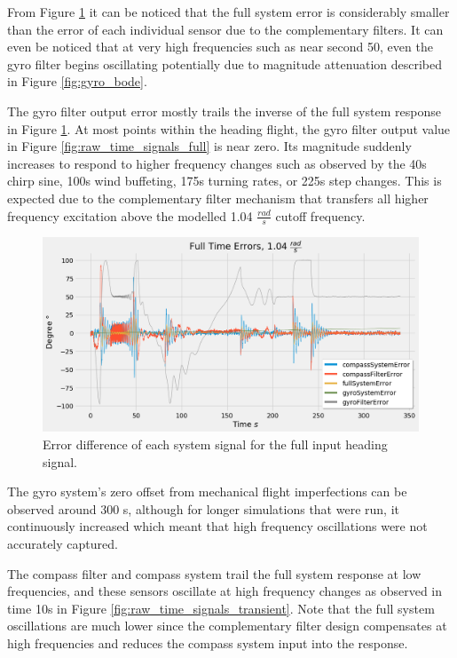From Figure \ref{fig:raw_time_errors_full} it can be noticed that the full system error is considerably smaller than the error of each individual sensor due to the complementary filters. It can even be noticed that at very high frequencies such as near second 50, even the gyro filter begins oscillating potentially due to magnitude attenuation described in Figure \ref{fig:gyro_bode}.

The gyro filter output error mostly trails the inverse of the full system response in Figure \ref{fig:raw_time_errors_full}. At most points within the heading flight, the gyro filter output value in Figure \ref{fig:raw_time_signals_full} is near zero. Its magnitude suddenly increases to respond to higher frequency changes such as observed by the 40s chirp sine, 100s wind buffeting, 175s turning rates, or 225s step changes. This is expected due to the complementary filter mechanism that transfers all higher frequency excitation above the modelled 1.04 $\frac{rad}{s}$ cutoff frequency.

\begin{figure}[H]
    \centering
    \includegraphics[width=\linewidth]{img/errorSignalsFullTimeResponse_1_0476.png}
    \caption{Error difference of each system signal for the full input heading signal.}
    \label{fig:raw_time_errors_full}
\end{figure}

The gyro system's zero offset from mechanical flight imperfections can be observed around 300 s, although for longer simulations that were run, it continuously increased which meant that high frequency oscillations were not accurately captured.

The compass filter and compass system trail the full system response at low frequencies, and these sensors oscillate at high frequency changes as observed in time 10s in Figure \ref{fig:raw_time_signals_transient}. Note that the full system oscillations are much lower since the complementary filter design compensates at high frequencies and reduces the compass system input into the response.

